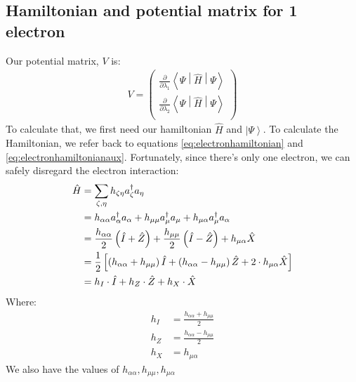 \documentclass{aux/ttuthes2007}
\newcommand{\ket}[1]{\ensuremath{\left|#1\right\rangle}}
\newcommand{\sandwich}[3]{\left< #1 \middle\vert #2 \middle\vert #3 \right>}
\newcommand{\paren}[1]{\left( #1 \right)}
\newcommand{\pd}[1]{\frac{\partial}{\partial #1}}
\newcommand{\anio}[1]{a_{\oo{#1}}}
\newcommand{\aniu}[1]{a_{\uo{#1}}}
\newcommand{\anig}[1]{a_{\go{#1}}}
\newcommand{\creo}[1]{a^\dagger_{\oo{#1}}}
\newcommand{\creu}[1]{a^\dagger_{\uo{#1}}}
\newcommand{\creg}[1]{a^\dagger_{\go{#1}}}
\newcommand{\uo}[1]{
		\IfEqCase{#1}{
			{0}{\mu}
			{1}{\nu}
			{2}{\xi}
		}[\PackageError{uo}{Undefined option to uo: #1}{}]
}
\newcommand{\oo}[1]{
		\IfEqCase{#1}{
			{0}{\alpha}
			{1}{\beta}
			{2}{\gamma}
		}[\PackageError{unocorb}{Undefined option to unuo: #1}{}]
}
\newcommand{\go}[1]{
		\IfEqCase{#1}{
			{0}{\zeta}
			{1}{\eta}
			{2}{\iota}
			{3}{\kappa}
		}[\PackageError{unocorb}{Undefined option to go: #1}{}]
}
\begin{document}
\subsection{\textbf{Hamiltonian and potential matrix for 1 electron}}

Our potential matrix, $V$ is:
%
\begin{equation*}
	\begin{split}
		V = \begin{pmatrix}
			\pd {\lambda_1} \sandwich {\Psi}{\hat H}{\Psi}\\
			\pd {\lambda_2} \sandwich {\Psi}{\hat H}{\Psi}\\
		\end{pmatrix}
	\end{split}
\end{equation*}
%
To calculate that, we first need our hamiltonian $\hat H$ and $\ket \Psi$. To calculate the Hamiltonian, we refer back to equations \ref{eq:electronhamiltonian} and \ref{eq:electronhamiltonianaux}. Fortunately, since there's only one electron, we can safely disregard the electron interaction:
%
\begin{equation*}
	\begin{split}
	\hat H  &= \sum_{\go 0, \go 1}h_{\go 0 \go 1}\creg 0 \anig 1 \\
		&= {h_{\alpha\alpha}} \creo 0 \anio 0
		+ {h_{\mu\mu}} \creu 0 \aniu 0
		+ h_{\mu\alpha} \creu 0 \anio 0 
%
		\\
%
		&= \frac{h_{\alpha\alpha}}{2} \paren{\hat I + \hat Z}
		+ \frac{h_{\mu\mu}}{2} \paren{\hat I - \hat Z}
		+ h_{\mu\alpha} \hat X
%
	\\
%
		&= 	\frac{1}{2} \left[ 
			\paren{h_{\alpha\alpha} + h_{\mu\mu}} \hat I 
		+	\paren{h_{\alpha\alpha} - h_{\mu\mu}} \hat Z
		+ 	2 \cdot h_{\mu\alpha} \hat X
	\right]
%
	\\
%
		&=	h_{I} \cdot \hat I 
		+	h_{Z} \cdot \hat Z
		+	h_{X} \cdot \hat X
	\end{split}
\end{equation*}
%
Where:
%
\begin{equation*}
	\begin{split}
			h_{I}
		&=	\frac{h_{\alpha\alpha} + h_{\mu\mu}} 2
%
	\\
%
			h_{Z}
		&=	\frac{h_{\alpha\alpha} - h_{\mu\mu}} 2
%
	\\
%
			h_{X}
		&= 	h_{\mu\alpha}
%
	\end{split}
\end{equation*}
%
We also have the values of
$
h_{\alpha\alpha}, h_{\mu\mu}, h_{\mu\alpha}$
\end{document}
